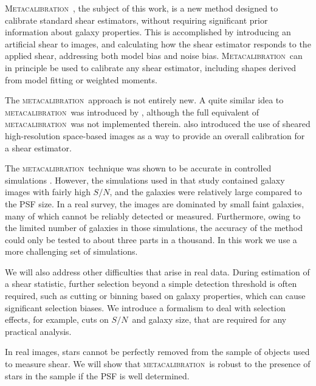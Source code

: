 \documentclass[iop, twocolappendix, appendixfloats, numberedappendix, apj]{emulateapj}
\newcommand{\snr}{$S/N$}
\newcommand{\mcal}{\textsc{metacalibration}}
\newcommand{\Mcal}{\textsc{Metacalibration}}
\begin{document}
\Mcal\ \citep{HuffMcal}, the subject of this work, is a new method designed to
calibrate standard shear estimators, without requiring significant prior
information about galaxy properties.  This is accomplished by introducing an
artificial shear to images, and calculating how the shear estimator responds to
the applied shear, addressing both model bias and noise bias.  \Mcal\ can in
principle be used to calibrate any shear estimator, including shapes derived
from model fitting or weighted moments.

The \mcal\ approach is not entirely new. A quite similar idea to \mcal\ was
introduced by \cite{Kaiser2000}, although the full equivalent of \mcal\ was not
implemented therein.  \cite{ksb95} also introduced the use of sheared
high-resolution space-based images as a way to provide an overall calibration
for a shear estimator.



The \mcal\ technique was shown to be accurate in controlled simulations
\citep{HuffMcal}.  However, the simulations used in that study \citep[based on
those used in][]{great3} contained galaxy images with fairly high \snr, and the
galaxies were relatively large compared to the PSF size.  In a real survey, the
images are dominated by small faint galaxies, many of which cannot be reliably
detected or measured.  Furthermore, owing to the limited number of galaxies in
those simulations, the accuracy of the method could only be tested to about
three parts in a thousand.  In this work we use a more challenging set of
simulations.

We will also address other difficulties that arise in real data.  During
estimation of a shear statistic, further selection beyond a simple detection
threshold is often required, such as cutting or binning based on galaxy
properties, which can cause significant selection biases.  We introduce a
formalism to deal with selection effects, for example, cuts on \snr\ and galaxy
size, that are required for any practical analysis. 

In real images, stars cannot be perfectly removed from the sample of objects
used to measure shear. We will show that \mcal\ is robust to the presence of
stars in the sample if the PSF is well determined.
\end{document}

